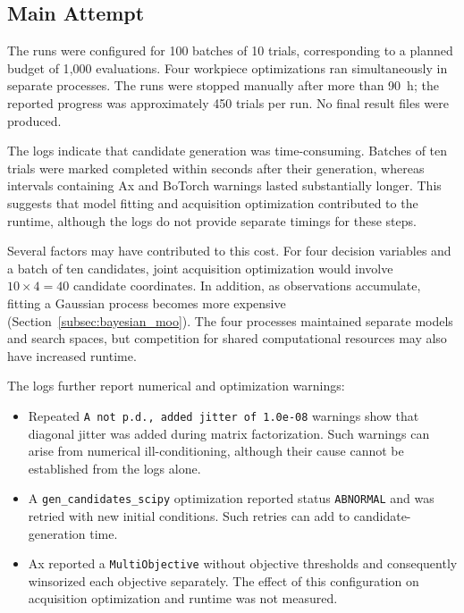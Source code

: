 \subsection{Main Attempt}
\label{subsec:results_bayesian_main}

The runs were configured for 100 batches of 10 trials, corresponding to a planned budget
of 1{,}000 evaluations. Four workpiece optimizations ran simultaneously in separate
processes. The runs were stopped manually after more than 90~h; the reported progress was
approximately 450 trials per run. No final result files were produced.

The logs indicate that candidate generation was time-consuming. Batches of ten
trials were marked completed within seconds after their generation, whereas
intervals containing Ax and BoTorch warnings lasted substantially longer. This
suggests that model fitting and acquisition optimization contributed to the
runtime, although the logs do not provide separate timings for these steps.

Several factors may have contributed to this cost. For four decision variables
and a batch of ten candidates, joint acquisition optimization would involve $10
\times 4 = 40$ candidate coordinates. In addition, as observations accumulate,
fitting a Gaussian process becomes more expensive
(Section~\ref{subsec:bayesian_moo}). The four processes maintained separate
models and search spaces, but competition for shared computational resources may
also have increased runtime.

The logs further report numerical and optimization warnings:

\begin{itemize}
    \item Repeated \texttt{A not p.d., added jitter of 1.0e-08} warnings show
    that diagonal jitter was added during matrix factorization. Such warnings
    can arise from numerical ill-conditioning, although their cause cannot be
    established from the logs alone.
    \item A \texttt{gen\_candidates\_scipy} optimization reported status
    \texttt{ABNORMAL} and was retried with new initial conditions. Such retries
    can add to candidate-generation time.
    \item Ax reported a \texttt{MultiObjective} without objective thresholds and
    consequently winsorized each objective separately. The effect of this
    configuration on acquisition optimization and runtime was not measured.
\end{itemize}

